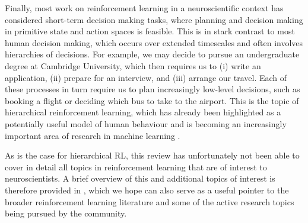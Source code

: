 Finally, most work on reinforcement learning in a neuroscientific context has considered short-term decision making tasks, where planning and decision making in primitive state and action spaces is feasible.
This is in stark contrast to most human decision making, which occurs over extended timescales and often involves hierarchies of decisions.
For example, we may decide to pursue an undergraduate degree at Cambridge University, which then requires us to (i) write an application, (ii) prepare for an interview, and (iii) arrange our travel.
Each of these processes in turn require us to plan increasingly low-level decisions, such as booking a flight or deciding which bus to take to the airport.
This is the topic of hierarchical reinforcement learning, which has already been highlighted as a potentially useful model of human behaviour \citep{eckstein2020computational,botvinick2008hierarchical,botvinick2009hierarchically} and is becoming an increasingly important area of research in machine learning \citep{pateria2021hierarchical}.

As is the case for hierarchical RL, this review has unfortunately not been able to cover in detail all topics in reinforcement learning that are of interest to neuroscientists.
A brief overview of this and additional topics of interest is therefore provided in , which we hope can also serve as a useful pointer to the broader reinforcement learning literature and some of the active research topics being pursued by the community.

